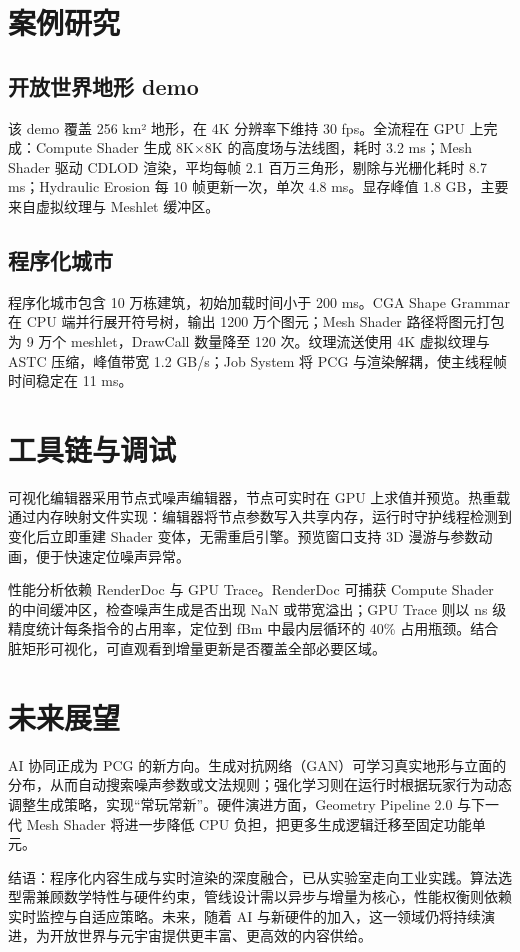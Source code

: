 \chapter{案例研究}
\section{开放世界地形 demo}
该 demo 覆盖 256 km² 地形，在 4K 分辨率下维持 30 fps。全流程在 GPU 上完成：Compute Shader 生成 8K×8K 的高度场与法线图，耗时 3.2 ms；Mesh Shader 驱动 CDLOD 渲染，平均每帧 2.1 百万三角形，剔除与光栅化耗时 8.7 ms；Hydraulic Erosion 每 10 帧更新一次，单次 4.8 ms。显存峰值 1.8 GB，主要来自虚拟纹理与 Meshlet 缓冲区。\par
\section{程序化城市}
程序化城市包含 10 万栋建筑，初始加载时间小于 200 ms。CGA Shape Grammar 在 CPU 端并行展开符号树，输出 1200 万个图元；Mesh Shader 路径将图元打包为 9 万个 meshlet，DrawCall 数量降至 120 次。纹理流送使用 4K 虚拟纹理与 ASTC 压缩，峰值带宽 1.2 GB/s；Job System 将 PCG 与渲染解耦，使主线程帧时间稳定在 11 ms。\par
\chapter{工具链与调试}
可视化编辑器采用节点式噪声编辑器，节点可实时在 GPU 上求值并预览。热重载通过内存映射文件实现：编辑器将节点参数写入共享内存，运行时守护线程检测到变化后立即重建 Shader 变体，无需重启引擎。预览窗口支持 3D 漫游与参数动画，便于快速定位噪声异常。\par
性能分析依赖 RenderDoc 与 GPU Trace。RenderDoc 可捕获 Compute Shader 的中间缓冲区，检查噪声生成是否出现 NaN 或带宽溢出；GPU Trace 则以 ns 级精度统计每条指令的占用率，定位到 fBm 中最内层循环的 40\%{} 占用瓶颈。结合脏矩形可视化，可直观看到增量更新是否覆盖全部必要区域。\par
\chapter{未来展望}
AI 协同正成为 PCG 的新方向。生成对抗网络（GAN）可学习真实地形与立面的分布，从而自动搜索噪声参数或文法规则；强化学习则在运行时根据玩家行为动态调整生成策略，实现“常玩常新”。硬件演进方面，Geometry Pipeline 2.0 与下一代 Mesh Shader 将进一步降低 CPU 负担，把更多生成逻辑迁移至固定功能单元。\par
结语：程序化内容生成与实时渲染的深度融合，已从实验室走向工业实践。算法选型需兼顾数学特性与硬件约束，管线设计需以异步与增量为核心，性能权衡则依赖实时监控与自适应策略。未来，随着 AI 与新硬件的加入，这一领域仍将持续演进，为开放世界与元宇宙提供更丰富、更高效的内容供给。\par
